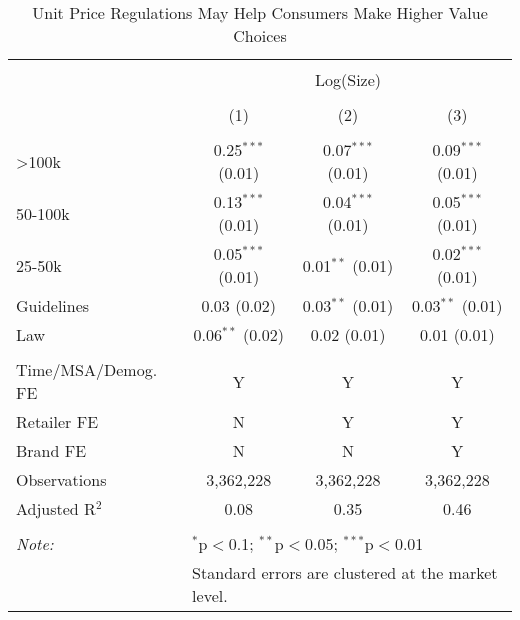 
\begin{table}[!htbp] \centering 
  \caption{Unit Price Regulations May Help Consumers Make Higher Value Choices} 
  \label{tab:unitPriceLawTp} 
\begin{tabular}{@{\extracolsep{5pt}}lccc} 
\\[-1.8ex]\hline 
\hline \\[-1.8ex] 
 & \multicolumn{3}{c}{Log(Size)} \\ 
\\[-1.8ex] & (1) & (2) & (3)\\ 
\hline \\[-1.8ex] 
 >100k & 0.25$^{***}$ (0.01) & 0.07$^{***}$ (0.01) & 0.09$^{***}$ (0.01) \\ 
  50-100k & 0.13$^{***}$ (0.01) & 0.04$^{***}$ (0.01) & 0.05$^{***}$ (0.01) \\ 
  25-50k & 0.05$^{***}$ (0.01) & 0.01$^{**}$ (0.01) & 0.02$^{***}$ (0.01) \\ 
  Guidelines & 0.03 (0.02) & 0.03$^{**}$ (0.01) & 0.03$^{**}$ (0.01) \\ 
  Law & 0.06$^{**}$ (0.02) & 0.02 (0.01) & 0.01 (0.01) \\ 
 \hline \\[-1.8ex] 
Time/MSA/Demog. FE & Y & Y & Y \\ 
Retailer FE & N & Y & Y \\ 
Brand FE & N & N & Y \\ 
Observations & 3,362,228 & 3,362,228 & 3,362,228 \\ 
Adjusted R$^{2}$ & 0.08 & 0.35 & 0.46 \\ 
\hline 
\hline \\[-1.8ex] 
\textit{Note:}  & \multicolumn{3}{l}{$^{*}$p$<$0.1; $^{**}$p$<$0.05; $^{***}$p$<$0.01} \\ 
 & \multicolumn{3}{l}{Standard errors are clustered at the market level.} \\ 
\end{tabular} 
\end{table} 
